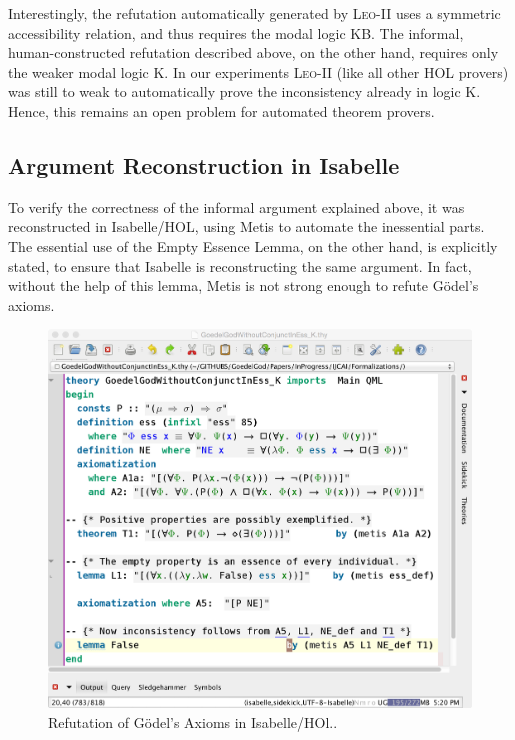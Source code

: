 \documentclass{article}
\begin{document}
Interestingly, the refutation automatically generated by
\textsc{Leo-II} uses a symmetric accessibility relation, and thus
requires the modal logic KB. The informal, human-constructed
refutation described above, on the other hand, requires only the
weaker modal logic K. In our experiments \textsc{Leo-II} (like all
other HOL provers) was still to weak to automatically prove the
inconsistency already in logic K. Hence, this remains an open problem for automated
theorem provers.


\subsection{Argument Reconstruction in Isabelle}

To verify the correctness of the informal argument explained above, it
was reconstructed in Isabelle/HOL, using Metis to automate the
inessential parts. The essential use of the Empty Essence Lemma, on
the other hand, is explicitly stated, to ensure that Isabelle is
reconstructing the same argument. In fact, without the help of this
lemma, Metis is not strong enough to refute G\"odel's axioms. 
\begin{figure}[t]
\centerline{\includegraphics[width=\columnwidth]{./Images/InconsistencyIsabelleK.png}}
\caption{Refutation of G\"odel's Axioms in Isabelle/HOl..} \label{InconsistencyIsabelleK}
\end{figure}
\end{document}
